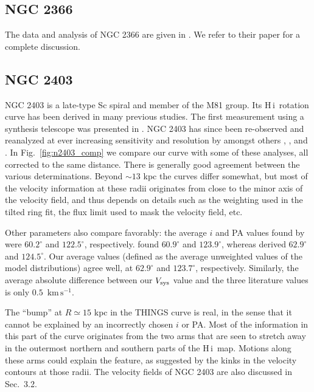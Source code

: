 \documentclass[usenatbib,usegraphicx,apjfonts,floatfix]{emulateapj}
\newcommand{\kms}{\ensuremath{\,\mbox{km}\,\mbox{s}^{-1}}}
\newcommand{\HI}{H\,{\sc i}}
\begin{document}
\subsection{NGC 2366}

The data and analysis of NGC 2366 are given in \citet{oh2007}. We
refer to their paper for a complete discussion.

\subsection{NGC 2403}

NGC 2403 is a late-type Sc spiral and member of the M81 group.  Its
\HI\ rotation curve has been derived in many previous studies. The
first measurement using a synthesis telescope was presented in
\citet{shostak1973}.  NGC 2403 has since been re-observed and
reanalyzed at ever increasing sensitivity and resolution by amongst
others \citet{bosma_phd}, \citet{begeman87}, \citet{sicking_phd} and
\citet{fraternali}. In Fig.~\ref{fig:n2403_comp} we compare our curve
with some of these analyses, all corrected to the same distance.
There is generally good agreement between the various
determinations. Beyond $\sim 13$ kpc the curves differ somewhat, but
most of the velocity information at these radii originates from close
to the minor axis of the velocity field, and thus depends on details
such as the weighting used in the tilted ring fit, the flux limit used
to mask the velocity field, etc.

Other parameters also compare favorably: the average $i$ and PA values
found by \citet{begeman87} were $60.2^{\circ}$ and $122.5^{\circ}$,
respectively.  \citet{sicking_phd} found $60.9^{\circ}$ and
$123.9^{\circ}$, whereas \citet{fraternali} derived $62.9^{\circ}$ and
$124.5^{\circ}$. Our average values (defined as the average unweighted
values of the model distributions) agree well, at $62.9^{\circ}$ and
$123.7^{\circ}$, respectively.  Similarly, the average absolute
difference between our $V_{\rm sys}$ value and the three literature
values is only $0.5$ \kms.

The ``bump'' at $R\simeq 15$ kpc in the THINGS curve is real, in the
sense that it cannot be explained by an incorrectly chosen $i$ or
PA. Most of the information in this part of the curve originates from
the two arms that are seen to stretch away in the outermost northern
and southern parts of the \HI\ map. Motions along these arms could
explain the feature, as suggested by the kinks in the velocity
contours at those radii.  The velocity fields of NGC 2403 are also
discussed in Sec.~3.2.
\end{document}
